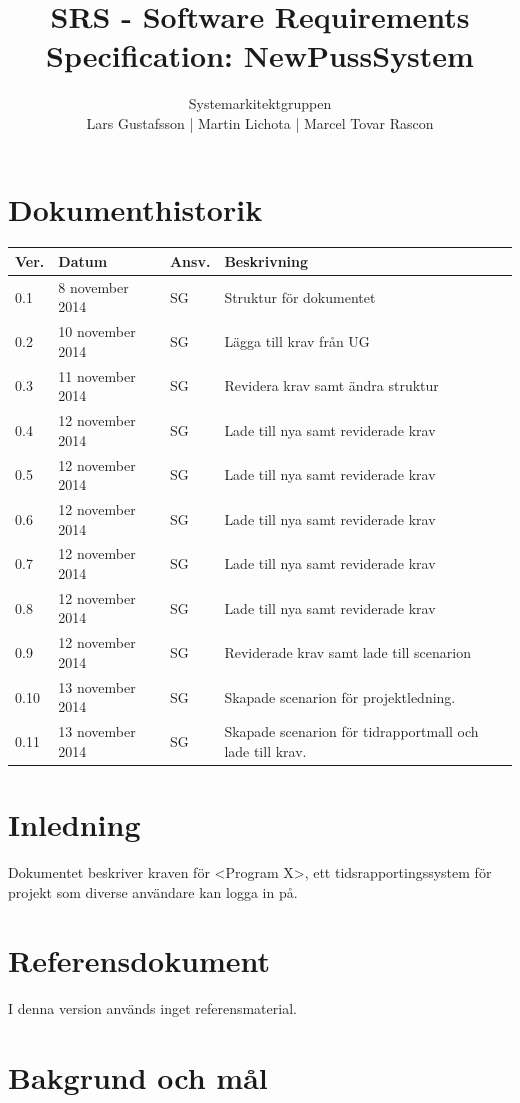 \documentclass[a4paper]{article}
\title{SRS - Software Requirements Specification: NewPussSystem}
\author{Systemarkitektgruppen \\ Lars Gustafsson | Martin Lichota | Marcel Tovar Rascon}
\date{}
\begin{document}
\maketitle
\thispagestyle{fancy}
\tableofcontents
\newpage

\section*{Dokumenthistorik}

\begin{tabular}{ l l l l }
Ver. & Datum & Ansv. & Beskrivning \\\hline
0.1 & 8 november 2014 & SG & Struktur för dokumentet\\
0.2 & 10 november 2014 & SG & Lägga till krav från UG\\
0.3 & 11 november 2014 & SG & Revidera krav samt ändra struktur\\
0.4 & 12 november 2014 & SG & Lade till nya samt reviderade krav\\
0.5 & 12 november 2014 & SG & Lade till nya samt reviderade krav\\
0.6 & 12 november 2014 & SG & Lade till nya samt reviderade krav\\
0.7 & 12 november 2014 & SG & Lade till nya samt reviderade krav\\
0.8 & 12 november 2014 & SG & Lade till nya samt reviderade krav\\
0.9 & 12 november 2014 & SG & Reviderade krav samt lade till scenarion\\
0.10 & 13 november 2014 & SG & Skapade scenarion för projektledning.\\
0.11 & 13 november 2014 & SG & Skapade scenarion för tidrapportmall och lade till krav.\\
\end{tabular}
\section{Inledning}       


Dokumentet beskriver kraven för <Program X>, ett tidsrapportingssystem för projekt som diverse användare kan logga in på.

\section{Referensdokument}
I denna version används inget referensmaterial.
\section{Bakgrund och mål}   
\end{document}

